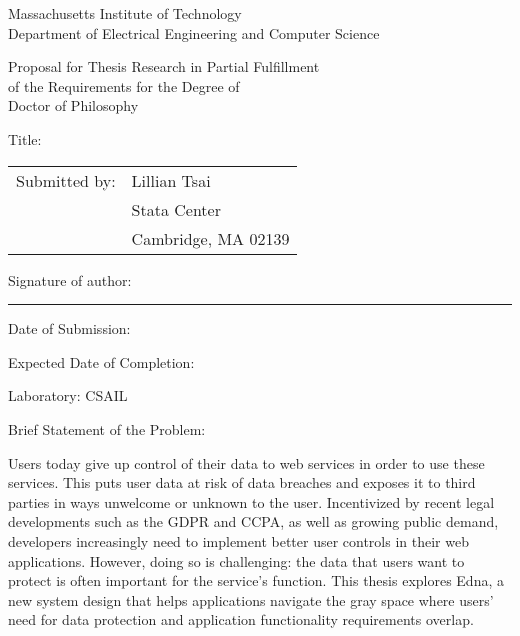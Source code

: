 
\begingroup


\begin{center}
Massachusetts Institute of Technology \\
Department of Electrical Engineering and Computer Science
\end{center}

\begin{center}
Proposal for Thesis Research in Partial Fulfillment \\
of the Requirements for the Degree of \\
Doctor of Philosophy
\end{center}

\vspace{1em}
\noindent Title: \mytitle

\vspace{1em}
\noindent\begin{tabular}{@{}ll}
Submitted by: & Lillian Tsai\\
              & Stata Center\\
              & Cambridge, MA 02139
\end{tabular}

\vspace{1em}
\noindent Signature of author: \rule{5cm}{0.1pt}

\vspace{1em}
\noindent Date of Submission: \mydate

\vspace{1em}
\noindent Expected Date of Completion: \mycompletion

\vspace{1em}
\noindent Laboratory: CSAIL 

\vspace{1em}
\noindent Brief Statement of the Problem:

\vspace{1em}
\begin{minipage}{\dimexpr\textwidth-1cm}

\noindent 
Users today give up control of their data to web services in order to use these services. This puts user data at risk of data breaches and exposes it to third parties in ways unwelcome or unknown to the user. Incentivized by recent legal developments such as the GDPR and CCPA, as well as growing public demand, developers increasingly need to implement better user controls in their web applications.
%
However, doing so is challenging: the data that users want to protect is often
    important for the service’s function. This thesis explores Edna, a new system
    design that helps applications navigate the gray space where users’ need for
    data protection and application functionality requirements overlap.

\end{minipage}

